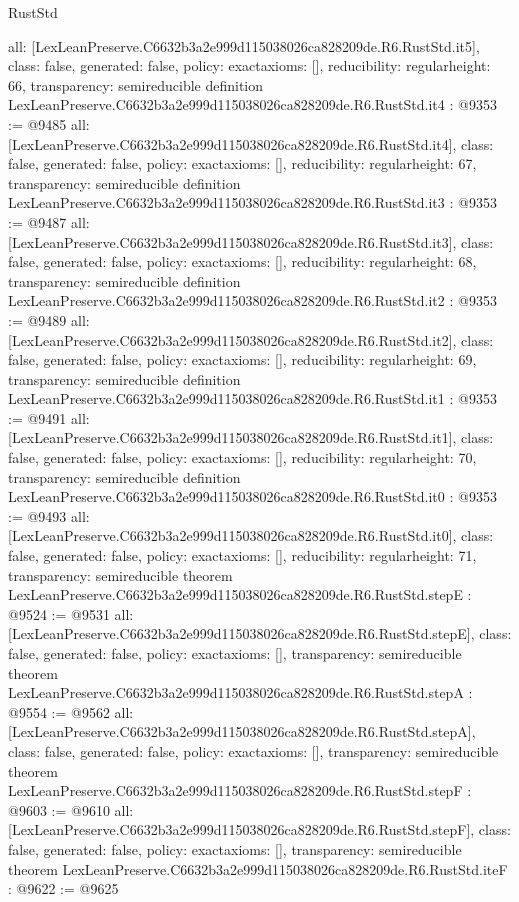 \begin{lexlean}{RustStd}
\begin{coremodule}
{  all: [LexLeanPreserve.C6632b3a2e999d115038026ca828209de.R6.RustStd.it5],
  class: false,
  generated: false,
  policy: exact{axioms: []},
  reducibility: regular{height: 66},
  transparency: semireducible
}
definition LexLeanPreserve.C6632b3a2e999d115038026ca828209de.R6.RustStd.it4 : @9353 := @9485 {
  all: [LexLeanPreserve.C6632b3a2e999d115038026ca828209de.R6.RustStd.it4],
  class: false,
  generated: false,
  policy: exact{axioms: []},
  reducibility: regular{height: 67},
  transparency: semireducible
}
definition LexLeanPreserve.C6632b3a2e999d115038026ca828209de.R6.RustStd.it3 : @9353 := @9487 {
  all: [LexLeanPreserve.C6632b3a2e999d115038026ca828209de.R6.RustStd.it3],
  class: false,
  generated: false,
  policy: exact{axioms: []},
  reducibility: regular{height: 68},
  transparency: semireducible
}
definition LexLeanPreserve.C6632b3a2e999d115038026ca828209de.R6.RustStd.it2 : @9353 := @9489 {
  all: [LexLeanPreserve.C6632b3a2e999d115038026ca828209de.R6.RustStd.it2],
  class: false,
  generated: false,
  policy: exact{axioms: []},
  reducibility: regular{height: 69},
  transparency: semireducible
}
definition LexLeanPreserve.C6632b3a2e999d115038026ca828209de.R6.RustStd.it1 : @9353 := @9491 {
  all: [LexLeanPreserve.C6632b3a2e999d115038026ca828209de.R6.RustStd.it1],
  class: false,
  generated: false,
  policy: exact{axioms: []},
  reducibility: regular{height: 70},
  transparency: semireducible
}
definition LexLeanPreserve.C6632b3a2e999d115038026ca828209de.R6.RustStd.it0 : @9353 := @9493 {
  all: [LexLeanPreserve.C6632b3a2e999d115038026ca828209de.R6.RustStd.it0],
  class: false,
  generated: false,
  policy: exact{axioms: []},
  reducibility: regular{height: 71},
  transparency: semireducible
}
theorem LexLeanPreserve.C6632b3a2e999d115038026ca828209de.R6.RustStd.stepE : @9524 := @9531 {
  all: [LexLeanPreserve.C6632b3a2e999d115038026ca828209de.R6.RustStd.stepE],
  class: false,
  generated: false,
  policy: exact{axioms: []},
  transparency: semireducible
}
theorem LexLeanPreserve.C6632b3a2e999d115038026ca828209de.R6.RustStd.stepA : @9554 := @9562 {
  all: [LexLeanPreserve.C6632b3a2e999d115038026ca828209de.R6.RustStd.stepA],
  class: false,
  generated: false,
  policy: exact{axioms: []},
  transparency: semireducible
}
theorem LexLeanPreserve.C6632b3a2e999d115038026ca828209de.R6.RustStd.stepF : @9603 := @9610 {
  all: [LexLeanPreserve.C6632b3a2e999d115038026ca828209de.R6.RustStd.stepF],
  class: false,
  generated: false,
  policy: exact{axioms: []},
  transparency: semireducible
}
theorem LexLeanPreserve.C6632b3a2e999d115038026ca828209de.R6.RustStd.iteF : @9622 := @9625 {
}
\end{coremodule}
\end{lexlean}
